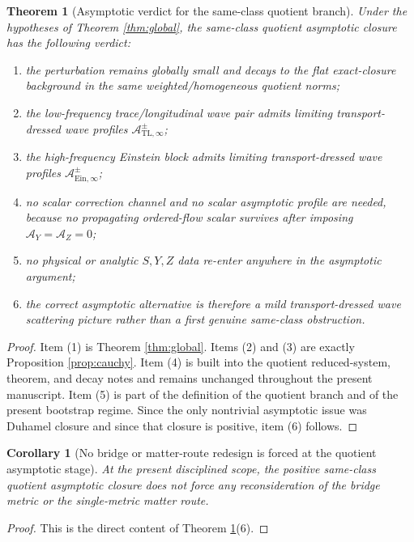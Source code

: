 \documentclass[11pt]{article}
\newcommand{\AY}{\mathcal A_Y}
\newcommand{\AZ}{\mathcal A_Z}
\newtheorem{corollary}{Corollary}
\newtheorem{theorem}{Theorem}
\begin{document}
\begin{theorem}[Asymptotic verdict for the same-class quotient branch]
\label{thm:verdict}
Under the hypotheses of Theorem \ref{thm:global}, the same-class quotient asymptotic closure has the following verdict:
\begin{enumerate}
    \item the perturbation remains globally small and decays to the flat exact-closure background in the same weighted/homogeneous quotient norms;
    \item the low-frequency trace/longitudinal wave pair admits limiting transport-dressed wave profiles \(\mathcal A_{\mathrm{TL},\infty}^\pm\);
    \item the high-frequency Einstein block admits limiting transport-dressed wave profiles \(\mathcal A_{\mathrm{Ein},\infty}^\pm\);
    \item no scalar correction channel and no scalar asymptotic profile are needed, because no propagating ordered-flow scalar survives after imposing \(\AY=\AZ=0\);
    \item no physical or analytic \(S,Y,Z\) data re-enter anywhere in the asymptotic argument;
    \item the correct asymptotic alternative is therefore a mild transport-dressed wave scattering picture rather than a first genuine same-class obstruction.
\end{enumerate}
\end{theorem}

\begin{proof}
Item (1) is Theorem \ref{thm:global}. Items (2) and (3) are exactly Proposition \ref{prop:cauchy}. Item (4) is built into the quotient reduced-system, theorem, and decay notes and remains unchanged throughout the present manuscript. Item (5) is part of the definition of the quotient branch and of the present bootstrap regime. Since the only nontrivial asymptotic issue was Duhamel closure and since that closure is positive, item (6) follows.
\end{proof}

\begin{corollary}[No bridge or matter-route redesign is forced at the quotient asymptotic stage]
\label{cor:nodeeper}
At the present disciplined scope, the positive same-class quotient asymptotic closure does not force any reconsideration of the bridge metric or the single-metric matter route.
\end{corollary}

\begin{proof}
This is the direct content of Theorem \ref{thm:verdict}(6).
\end{proof}
\end{document}
